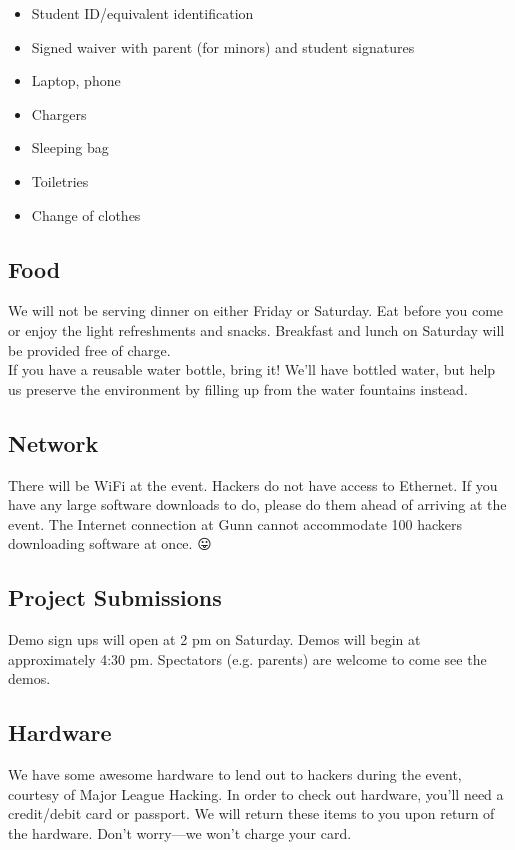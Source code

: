 \documentclass[12pt,onesided,letterpaper]{article}
\begin{document}
\begin{itemize}
\item Student ID\slash equivalent identification
\item Signed waiver with parent (for minors) and student signatures
\item Laptop, phone
\item Chargers
\item Sleeping bag
\item Toiletries
\item Change of clothes
\end{itemize}

\subsection*{Food}

We will not be serving dinner on either Friday or Saturday. Eat before you come or enjoy the light refreshments and snacks. Breakfast and lunch on Saturday will be provided free of charge.\\

If you have a reusable water bottle, bring it! We'll have bottled water, but help us preserve the environment by filling up from the water fountains instead.

\subsection*{Network}

There will be WiFi at the event. Hackers do not have access to Ethernet. If you have any large software downloads to do, please do them ahead of arriving at the event. The Internet connection at Gunn cannot accommodate 100 hackers downloading software at once. {\DejaSans 😛}

\subsection*{Project Submissions}

Demo sign ups will open at 2 pm on Saturday. Demos will begin at approximately 4:30 pm. Spectators (e.g. parents) are welcome to come see the demos.

\subsection*{Hardware}

We have some awesome hardware to lend out to hackers during the event, courtesy of Major League Hacking. In order to check out hardware, you'll need a credit\slash debit card or passport. We will return these items to you upon return of the hardware. Don't worry---we won't charge your card.\\
\end{document}
